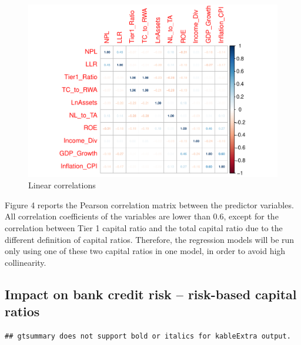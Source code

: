\documentclass{article}
\begin{document}
\begin{figure}

{\centering \includegraphics{preprint_files/figure-latex/correlation-1} 

}

\caption{Linear correlations}\label{fig:correlation}
\end{figure}

Figure 4 reports the Pearson correlation matrix between the predictor
variables. All correlation coefficients of the variables are lower than
0.6, except for the correlation between Tier 1 capital ratio and the
total capital ratio due to the different definition of capital ratios.
Therefore, the regression models will be run only using one of these two
capital ratios in one model, in order to avoid high collinearity.

\hypertarget{impact-on-bank-credit-risk-risk-based-capital-ratios}{%
\subsection{Impact on bank credit risk -- risk-based capital
ratios}\label{impact-on-bank-credit-risk-risk-based-capital-ratios}}

\begin{verbatim}
## gtsummary does not support bold or italics for kableExtra output.
\end{verbatim}

\begingroup\fontsize{6}{8}\selectfont
\end{document}
